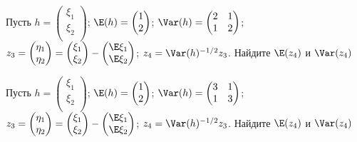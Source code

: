 \documentclass[pdftex,11pt,openany]{book}\usepackage[]{graphicx}\usepackage[]{color}
\begin{document}
\begin{problem}
Пусть $h =  \begin{pmatrix}
\xi_1 \\
\xi_2 \\
\end{pmatrix} $; $\E (h) =  \begin{pmatrix}
1\\
2\\
\end{pmatrix} $; $\Var (h) =  \begin{pmatrix}
2 & 1 \\
1 & 2 \\
\end{pmatrix} $; $z_3 =  \begin{pmatrix}
\eta_1 \\
\eta_2 \\
\end{pmatrix}  =  \begin{pmatrix}
\xi_1 \\
\xi_2 \\
\end{pmatrix}  -  \begin{pmatrix}
\E \xi_1 \\
\E \xi_2 \\
\end{pmatrix} $; $z_4 = \Var (h)^{-1/2} z_3$. Найдите $\E (z_4)$ и $\Var (z_4)$
\end{problem}

\begin{solution}
\end{solution}



\begin{problem}
Пусть $h =  \begin{pmatrix}
\xi_1 \\
\xi_2 \\
\end{pmatrix} $; $\E (h) =  \begin{pmatrix}
1\\
2\\
\end{pmatrix} $; $\Var (h) =  \begin{pmatrix}
3 & 1 \\
1 & 3 \\
\end{pmatrix} $; $z_3 =  \begin{pmatrix}
\eta_1 \\
\eta_2 \\
\end{pmatrix}  =  \begin{pmatrix}
\xi_1 \\
\xi_2 \\
\end{pmatrix}  -  \begin{pmatrix}
\E \xi_1 \\
\E \xi_2 \\
\end{pmatrix} $; $z_4 = \Var (h)^{-1/2} z_3$. Найдите $\E (z_4)$ и $\Var (z_4)$
\end{problem}
\end{document}
